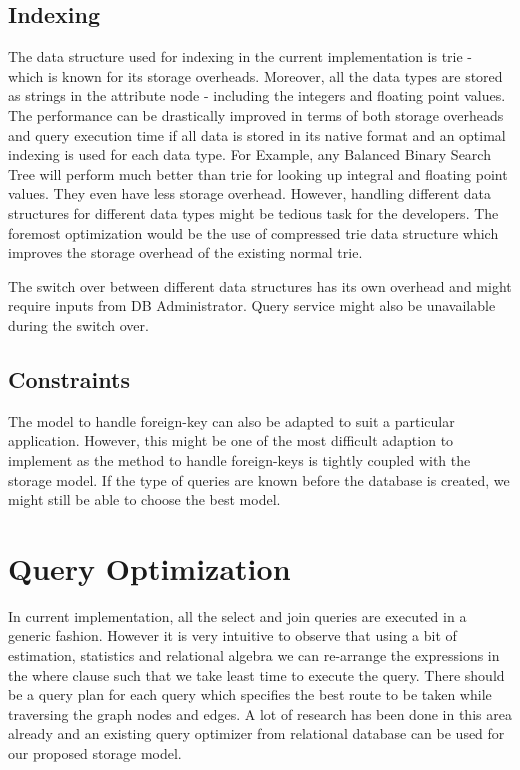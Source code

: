 \documentclass[12pt, oneside]{book}
\begin{document}
\subsection{Indexing}
The data structure used for indexing in the current implementation is trie - which is known for its storage overheads. Moreover, all the data types are stored as strings in the attribute node - including the integers and floating point values. The performance can be drastically improved in terms of both storage overheads and query execution time if all data is stored in its native format and an optimal indexing is used for each data type. For Example, any Balanced Binary Search Tree will perform much better than trie for looking up integral and floating point values. They even have less storage overhead. However, handling different data structures for different data types might be tedious task for the developers. The foremost optimization would be the use of compressed trie data structure which improves the storage overhead of the existing normal trie. \\ \par
The switch over between different data structures has its own overhead and might require inputs from DB Administrator. Query service might also be unavailable during the switch over.
\subsection{Constraints}
The model to handle foreign-key can also be adapted to suit a particular application. However, this might be one of the most difficult adaption to implement as the method to handle foreign-keys is tightly coupled with the storage model. If the type of queries are known before the database is created, we might still be able to choose the best model.
\section{Query Optimization}
In current implementation, all the select and join queries are executed in a generic fashion. However it is very intuitive to observe that using a bit of estimation, statistics and relational algebra we can re-arrange the expressions in the where clause such that we take least time to execute the query. There should be a query plan for each query which specifies the best route to be taken while traversing the graph nodes and edges. A lot of research has been done in this area already and an existing query optimizer from relational database can be used for our proposed storage model.
%
%
\end{document}
